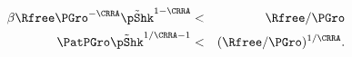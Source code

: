 \begin{eqnarray}
    \beta \Rfree \PGro^{-\CRRA} \tilde{\pShk}^{1-\CRRA}  & < & \Rfree/\PGro \nonumber
\\ \PatPGro \tilde{\pShk}^{1/\CRRA-1} & < & (\Rfree/\PGro)^{1/\CRRA} \label{eq:FVACAlt}.
\end{eqnarray}
